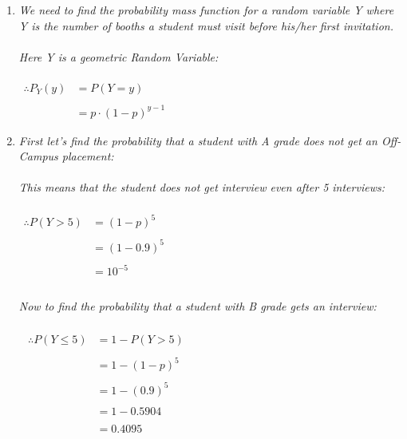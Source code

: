 \documentclass{article}
\begin{document}
\begin{enumerate}
\begin{enumerate}
    \item \textit{We need to find the probability mass function for 
a random variable Y where Y is the number of booths a student must visit before his/her first invitation.}\\\\
\textit{Here Y is a geometric Random Variable: }\\\\
$\begin{aligned}
 \therefore   P_{Y}(y) &= P(Y=y)\\\\
 &= p \cdot (1 - p)^{y-1}
\end{aligned}$

\newpage
\item
\textit{First let's find the probability that a student with A grade does not get an Off-Campus placement: }\\\\

\textit{This means that the student does not get interview even after 5 interviews: }\\\\
$\begin{aligned}
    \therefore P(Y > 5) &= (1 - p)^5\\\\
    &= (1 - 0.9)^5\\\\
    &= 10^{-5}\\\\
\end{aligned}$

\textit{Now to find the probability that a student with B grade gets an interview: }\\\\
$\begin{aligned}
    \begin{aligned}
        \therefore P(Y \leq 5) &= 1 - P(Y > 5)\\\\
        &= 1 - (1 - p)^5\\\\
        &= 1 - (0.9)^5\\\\
        &= 1 - 0.5904\\\\
        &= 0.4095\\\\
    \end{aligned}
\end{aligned}$
\end{enumerate}
\newpage


\end{enumerate}
\end{document}
